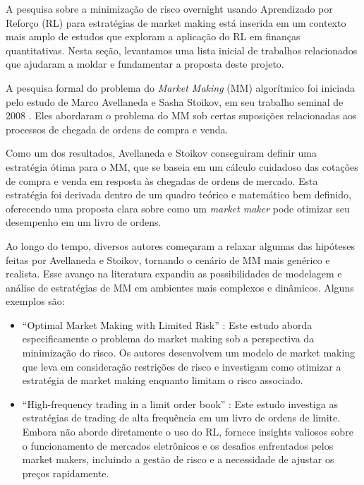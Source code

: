 A pesquisa sobre a minimização de risco overnight usando Aprendizado por Reforço (RL) para estratégias de market making está inserida em um contexto mais amplo de estudos que exploram a aplicação do RL em finanças quantitativas. Nesta seção, levantamos uma lista inicial de trabalhos relacionados que ajudaram a moldar e fundamentar a proposta deste projeto.

A pesquisa formal do problema do \textit{Market Making} (MM) algorítmico foi iniciada pelo estudo de Marco Avellaneda e Sasha Stoikov, em seu trabalho seminal de 2008 \citep{Avellaneda2008}. Eles abordaram o problema do MM sob certas suposições relacionadas aos processos de chegada de ordens de compra e venda.

Como um dos resultados, Avellaneda e Stoikov conseguiram definir uma estratégia ótima para o MM, que se baseia em um cálculo cuidadoso das cotações de compra e venda em resposta às chegadas de ordens de mercado. Esta estratégia foi derivada dentro de um quadro teórico e matemático bem definido, oferecendo uma proposta clara sobre como um \textit{market maker} pode otimizar seu desempenho em um livro de ordens.

Ao longo do tempo, diversos autores começaram a relaxar algumas das hipóteses feitas por Avellaneda e Stoikov, tornando o cenário de MM mais genérico e realista. Esse avanço na literatura expandiu as possibilidades de modelagem e análise de estratégias de MM em ambientes mais complexos e dinâmicos. Alguns exemplos são:
\begin{itemize}
    \item ``Optimal Market Making with Limited Risk'' \citep{Gueant2017}: Este estudo aborda especificamente o problema do market making sob a perspectiva da minimização do risco. Os autores desenvolvem um modelo de market making que leva em consideração restrições de risco e investigam como otimizar a estratégia de market making enquanto limitam o risco associado.
    \item ``High-frequency trading in a limit order book'' \citep{Avellaneda2008}: Este estudo investiga as estratégias de trading de alta frequência em um livro de ordens de limite. Embora não aborde diretamente o uso do RL, fornece insights valiosos sobre o funcionamento de mercados eletrônicos e os desafios enfrentados pelos market makers, incluindo a gestão de risco e a necessidade de ajustar os preços rapidamente.
\end{itemize}

